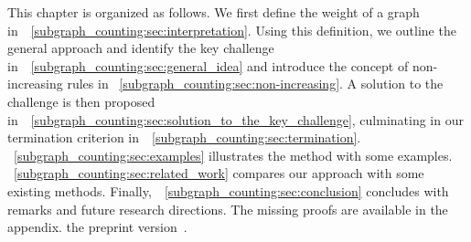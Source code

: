 

 
   
This chapter is organized as follows.
We first define the weight of a graph in~\textsection~\ref{subgraph_counting:sec:interpretation}. 
Using this definition, we outline the general approach and identify the key challenge in~\textsection~\ref{subgraph_counting:sec:general_idea} and introduce the concept of non-increasing rules in \textsection~\ref{subgraph_counting:sec:non-increasing}. 
A solution to the challenge is then proposed in~\textsection~\ref{subgraph_counting:sec:solution_to_the_key_challenge}, culminating in our termination criterion in~\textsection~\ref{subgraph_counting:sec:termination}.
\textsection~\ref{subgraph_counting:sec:examples} illustrates the method with some examples.
\textsection~\ref{subgraph_counting:sec:related_work} compares our approach with some existing methods.
Finally,~\textsection~\ref{subgraph_counting:sec:conclusion} concludes with remarks and future research directions. The missing proofs are available in 
\iflongversion
the appendix.
\else
the preprint version~\cite{qiu2025termination}.
\fi